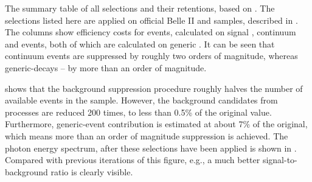 \begin{table}[htbp!]
    \centering
    \caption{\label{tab:cutflow} The summary table of all selections and their retentions, based on .
    The selections listed here are applied on official Belle II \feiBp and \feiBz samples, described in .
    The columns show efficiency costs for \BtoXsgamma events, calculated on signal \MC, continuum and \BB events, both of which are calculated on generic \MC.
    It can be seen that continuum events are suppressed by roughly two orders of magnitude, whereas generic-\BB decays -- by more than an order of magnitude.
    }
    
\end{table}

 shows that the background suppression procedure roughly halves the number of available \BtoXsgamma events in the sample.
However, the background candidates from \epem\ra\qqbar processes are reduced 200 times, to less than 0.5\% of the original value.
Furthermore, generic-\BB event contribution is estimated at about 7\% of the original, which means more than an order of magnitude suppression is achieved.
The photon energy spectrum, after these selections have been applied is shown in .
Compared with previous iterations of this figure, e.g., a much better signal-to-background ratio is clearly visible.

